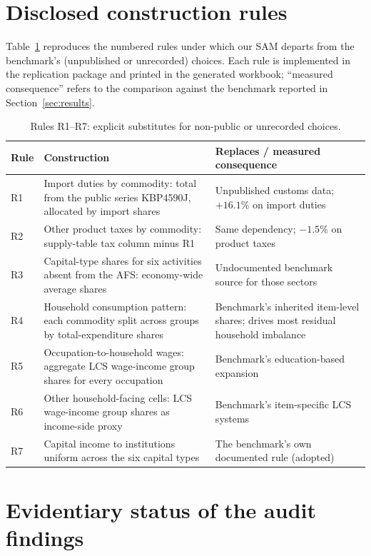 \section{Disclosed construction rules}\label{app:rules}

Table~\ref{tab:rules} reproduces the numbered rules under which our SAM
departs from the benchmark's (unpublished or unrecorded) choices. Each rule
is implemented in the replication package and printed in the generated
workbook; ``measured consequence'' refers to the comparison against the
benchmark reported in Section~\ref{sec:results}.

\begin{table}[h]
\centering\small
\caption{Rules R1--R7: explicit substitutes for non-public or unrecorded choices.}
\label{tab:rules}
\begin{tabularx}{\textwidth}{lXX}
\toprule
Rule & Construction & Replaces / measured consequence \\
\midrule
R1 & Import duties by commodity: total from the public series KBP4590J, allocated by import shares & Unpublished customs data; $+16.1$\% on import duties \\
R2 & Other product taxes by commodity: supply-table tax column minus R1 & Same dependency; $-1.5$\% on product taxes \\
R3 & Capital-type shares for six activities absent from the AFS: economy-wide average shares & Undocumented benchmark source for those sectors \\
R4 & Household consumption pattern: each commodity split across groups by total-expenditure shares & Benchmark's inherited item-level shares; drives most residual household imbalance \\
R5 & Occupation-to-household wages: aggregate LCS wage-income group shares for every occupation & Benchmark's education-based expansion \\
R6 & Other household-facing cells: LCS wage-income group shares as income-side proxy & Benchmark's item-specific LCS systems \\
R7 & Capital income to institutions uniform across the six capital types & The benchmark's own documented rule (adopted) \\
\bottomrule
\end{tabularx}
\end{table}

\section{Evidentiary status of the audit findings}\label{app:evidence}

